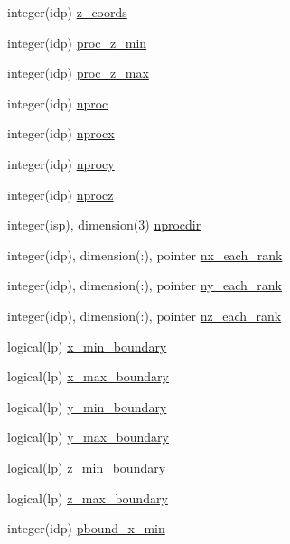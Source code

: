 \begin{DoxyCompactItemize}
integer(idp) \hyperlink{namespaceshared__data_a208c54ff19ecd9211442644004e44a79}{z\+\_\+coords}
\item 
integer(idp) \hyperlink{namespaceshared__data_a06a39cbc901b9e189a9d93eee920aeaa}{proc\+\_\+z\+\_\+min}
\item 
integer(idp) \hyperlink{namespaceshared__data_a8ef64b5a98510b366e28a0f32790c1cc}{proc\+\_\+z\+\_\+max}
\item 
integer(idp) \hyperlink{namespaceshared__data_a17ce7b1395fd76d2bb16c475d56cd08b}{nproc}
\item 
integer(idp) \hyperlink{namespaceshared__data_a83d7bbce1bbb5ff87a019c7ee7fa6f81}{nprocx}
\item 
integer(idp) \hyperlink{namespaceshared__data_a86495fbffc6b53172334c5fe8109fed8}{nprocy}
\item 
integer(idp) \hyperlink{namespaceshared__data_ab80ca6154fd93118dc6455ec5e12de43}{nprocz}
\item 
integer(isp), dimension(3) \hyperlink{namespaceshared__data_a73f0e719e591e27a33b1e75d95ae31cb}{nprocdir}
\item 
integer(idp), dimension(\+:), pointer \hyperlink{namespaceshared__data_a9ea44b080aed4db2eaa320878f266ace}{nx\+\_\+each\+\_\+rank}
\item 
integer(idp), dimension(\+:), pointer \hyperlink{namespaceshared__data_a1307d0cb9f9d652ec67954e53bf04706}{ny\+\_\+each\+\_\+rank}
\item 
integer(idp), dimension(\+:), pointer \hyperlink{namespaceshared__data_a39afe3f315d74dc819777e3345afbdd3}{nz\+\_\+each\+\_\+rank}
\item 
logical(lp) \hyperlink{namespaceshared__data_a016aabf832acc2511d767d2736e9ce95}{x\+\_\+min\+\_\+boundary}
\item 
logical(lp) \hyperlink{namespaceshared__data_ac0044d1bc7bb3189c0c1294d8b71b0d0}{x\+\_\+max\+\_\+boundary}
\item 
logical(lp) \hyperlink{namespaceshared__data_ae92a066d51a02d4b4a60837c3033066d}{y\+\_\+min\+\_\+boundary}
\item 
logical(lp) \hyperlink{namespaceshared__data_a45584e39581808654dfb5aafe584b033}{y\+\_\+max\+\_\+boundary}
\item 
logical(lp) \hyperlink{namespaceshared__data_aa748805397529f7eca50f76b9beed0d5}{z\+\_\+min\+\_\+boundary}
\item 
logical(lp) \hyperlink{namespaceshared__data_aa4005dc9afe16dc3fb569acf6236e135}{z\+\_\+max\+\_\+boundary}
\item 
integer(idp) \hyperlink{namespaceshared__data_ab9740d57cf165e22f3691c51de24c520}{pbound\+\_\+x\+\_\+min}

\end{DoxyCompactItemize}

